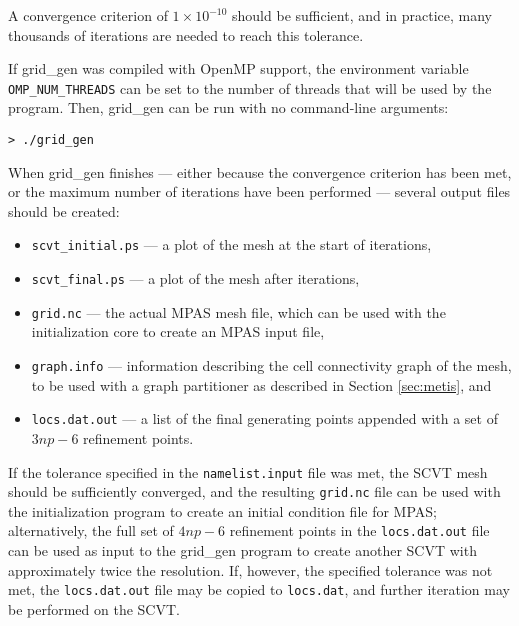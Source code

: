 \noindent A convergence criterion of $1\times10^{-10}$ should be sufficient, and in                     
practice, many thousands of iterations are needed to reach this tolerance.

If grid\_gen was compiled with OpenMP support, the environment variable {\tt OMP\_NUM\_THREADS} can be set to the 
number of threads that will be used by the program. Then, grid\_gen can be run with no command-line arguments:

\vspace{12pt}
{\tt > ./grid\_gen}
\vspace{12pt}
                                                                                         
                                                                                                
When grid\_gen finishes --- either because the convergence criterion has been met, or the
maximum number of iterations have been performed ---  several output files should be created: 

\begin{itemize}
\item {\tt scvt\_initial.ps} --- a plot of the mesh at the start of iterations,
\item {\tt scvt\_final.ps} --- a plot of the mesh after iterations,
\item {\tt grid.nc} --- the actual MPAS mesh file, which can be used with the initialization core to create an MPAS input file,
\item {\tt graph.info} --- information describing the cell connectivity graph of the mesh, to be used with a graph partitioner as described in Section \ref{sec:metis}, and
\item {\tt locs.dat.out} --- a list of the final generating points appended with a set of $3 np - 6$ refinement points. 
\end{itemize}

If the tolerance specified in the {\tt namelist.input} file was met, the SCVT mesh should be sufficiently converged, and the resulting {\tt grid.nc}
file can be used with the initialization program to create an initial condition file for MPAS; alternatively, the full set of $4 np - 6$ refinement points in 
the {\tt locs.dat.out} file can be used as input to the grid\_gen program to create another SCVT with approximately twice the resolution. If, however, the specified tolerance was not met, the {\tt locs.dat.out} file may be copied to {\tt locs.dat}, and further iteration may be performed on the SCVT.


